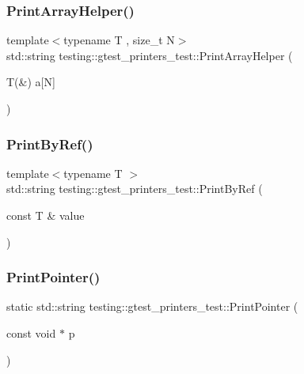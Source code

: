 \subsubsection{\texorpdfstring{PrintArrayHelper()}{PrintArrayHelper()}}
{\footnotesize\ttfamily template$<$typename T , size\+\_\+t N$>$ \\
std\+::string testing\+::gtest\+\_\+printers\+\_\+test\+::\+Print\+Array\+Helper (\begin{DoxyParamCaption}\item[{T(\&)}]{a\mbox{[}\+N\mbox{]} }\end{DoxyParamCaption})}

\mbox{\label{namespacetesting_1_1gtest__printers__test_a680e1fd7cfbae100466abe89567a0ee9}} 
\subsubsection{\texorpdfstring{PrintByRef()}{PrintByRef()}}
{\footnotesize\ttfamily template$<$typename T $>$ \\
std\+::string testing\+::gtest\+\_\+printers\+\_\+test\+::\+Print\+By\+Ref (\begin{DoxyParamCaption}\item[{const T \&}]{value }\end{DoxyParamCaption})}

\mbox{\label{namespacetesting_1_1gtest__printers__test_ac1a9747bc3353294dd18c295a03915e2}} 
\subsubsection{\texorpdfstring{PrintPointer()}{PrintPointer()}}
{\footnotesize\ttfamily static std\+::string testing\+::gtest\+\_\+printers\+\_\+test\+::\+Print\+Pointer (\begin{DoxyParamCaption}\item[{const void $\ast$}]{p }\end{DoxyParamCaption})\hspace{0.3cm}{\ttfamily [static]}}

